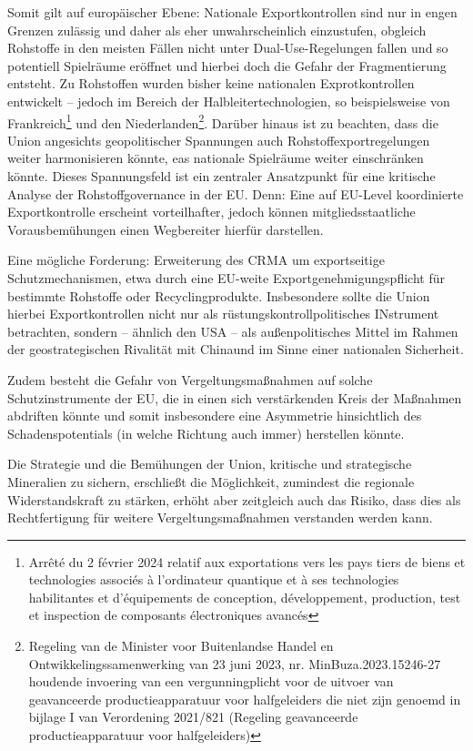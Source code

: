 \documentclass[12pt,a4paper,oneside]{book} %
\begin{document}
Somit gilt auf europäischer Ebene: Nationale Exportkontrollen sind nur in engen Grenzen zulässig und daher als eher unwahrscheinlich einzustufen, obgleich Rohstoffe in den meisten Fällen nicht unter Dual-Use-Regelungen fallen und so potentiell Spielräume eröffnet und hierbei doch die Gefahr der Fragmentierung entsteht. Zu Rohstoffen wurden bisher keine nationalen Exprotkontrollen entwickelt -- jedoch im Bereich der Halbleitertechnologien, so beispielsweise von Frankreich\footnote{Arrêté du 2 février 2024 relatif aux exportations vers les pays tiers de biens et technologies associés à l'ordinateur quantique et à ses technologies habilitantes et d'équipements de conception, développement, production, test et inspection de composants électroniques avancés} und den Niederlanden\footnote{Regeling van de Minister voor Buitenlandse Handel en Ontwikkelingssamenwerking van 23 juni 2023, nr. MinBuza.2023.15246-27 houdende invoering van een vergunningplicht voor de uitvoer van geavanceerde productieapparatuur voor halfgeleiders die niet zijn genoemd in bijlage I van Verordening 2021/821 (Regeling geavanceerde productieapparatuur voor halfgeleiders)}.
Darüber hinaus ist zu beachten, dass die Union angesichts geopolitischer Spannungen auch Rohstoffexportregelungen weiter harmonisieren könnte, eas nationale Spielräume weiter einschränken könnte. Dieses Spannungsfeld ist ein zentraler Ansatzpunkt für eine kritische Analyse der Rohstoffgovernance in der EU. Denn: Eine auf EU-Level koordinierte Exportkontrolle erscheint vorteilhafter, jedoch können mitgliedsstaatliche Vorausbemühungen einen Wegbereiter hierfür darstellen.\autocite{Medunic, Nr 15 Juli 2024, S. 3}

Eine mögliche Forderung: Erweiterung des CRMA um exportseitige Schutzmechanismen, etwa durch eine EU-weite Exportgenehmigungspflicht für bestimmte Rohstoffe oder Recyclingprodukte. Insbesondere sollte die Union hierbei Exportkontrollen nicht nur als rüstungskontrollpolitisches INstrument betrachten, sondern -- ähnlich den USA -- als \glqq außenpolitisches Mittel im Rahmen der geostrategischen Rivalität mit China\grqq und im Sinne einer nationalen Sicherheit.\autocite{Medunic, Nr 15 Juli 2024, S. 3}

Zudem besteht die Gefahr von Vergeltungsmaßnahmen auf solche Schutzinstrumente der EU, die in einen sich verstärkenden Kreis der Maßnahmen abdriften könnte und somit insbesondere eine Asymmetrie hinsichtlich des Schadenspotentials (in welche Richtung auch immer) herstellen könnte.

Die Strategie und die Bemühungen der Union, kritische und strategische Mineralien zu sichern, erschließt die Möglichkeit, zumindest die regionale Widerstandskraft zu stärken, erhöht aber zeitgleich auch das Risiko, dass dies als Rechtfertigung für weitere Vergeltungsmaßnahmen verstanden werden kann.\autocite[siehe auch]{Schroeder, Patrick: Letter: Race for critical minerals sparks call for new materials agency, FT, July 14 2025}
\end{document}
